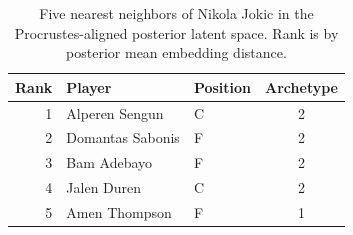 \begin{table}[htbp]
  \centering\small
  \begin{tabular}{rllc}
    \toprule
    Rank & Player & Position & Archetype \\
    \midrule
    1 & Alperen Sengun & C & 2 \\
    2 & Domantas Sabonis & F & 2 \\
    3 & Bam Adebayo & F & 2 \\
    4 & Jalen Duren & C & 2 \\
    5 & Amen Thompson & F & 1 \\
    \bottomrule
  \end{tabular}
  \caption{Five nearest neighbors of Nikola Jokic in the Procrustes-aligned posterior latent space. Rank is by posterior mean embedding distance.}
  \label{tab:Nikola_Jokic_neighbors}
\end{table}

